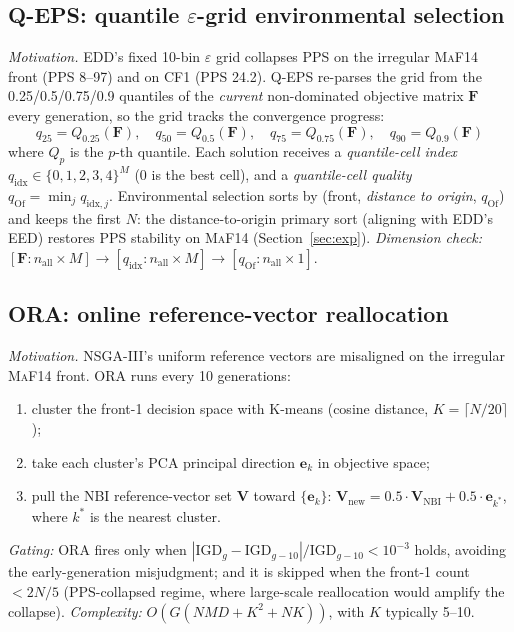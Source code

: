 \documentclass[preprint,12pt]{elsarticle}
\begin{document}
\subsection{\textsc{Q-EPS}: quantile $\varepsilon$-grid environmental
selection}
\label{sec:qeps}
\emph{Motivation.} EDD's fixed 10-bin $\varepsilon$ grid collapses PPS on
the irregular \textsc{MaF14} front (PPS 8--97) and on \textsc{CF1}
(PPS 24.2). \textsc{Q-EPS} re-parses the grid from the 0.25/0.5/0.75/0.9
quantiles of the \emph{current} non-dominated objective matrix
$\mathbf{F}$ every generation, so the grid tracks the convergence progress:
\begin{equation}
q_{25}=Q_{0.25}(\mathbf{F}),\quad
q_{50}=Q_{0.5}(\mathbf{F}),\quad
q_{75}=Q_{0.75}(\mathbf{F}),\quad
q_{90}=Q_{0.9}(\mathbf{F})
\end{equation}
where $Q_p$ is the $p$-th quantile. Each solution receives a
\emph{quantile-cell index} $q_{\mathrm{idx}}\in\{0,1,2,3,4\}^{M}$ (0 is the
best cell), and a \emph{quantile-cell quality}
$q_{\mathrm{Of}}=\min_j q_{\mathrm{idx},j}$. Environmental selection
sorts by (front, \emph{distance to origin}, $q_{\mathrm{Of}}$) and keeps the
first $N$: the distance-to-origin primary sort (aligning with EDD's
\textsc{EED}) restores PPS stability on \textsc{MaF14} (Section~\ref{sec:exp}).
\emph{Dimension check:} $[\mathbf{F}:n_{\text{all}}\times M]\to[q_{\mathrm{idx}}:
n_{\text{all}}\times M]\to[q_{\mathrm{Of}}:n_{\text{all}}\times 1]$.

\subsection{\textsc{ORA}: online reference-vector reallocation}
\label{sec:ora}
\emph{Motivation.} NSGA-III's uniform reference vectors are misaligned on
the irregular \textsc{MaF14} front. \textsc{ORA} runs every 10 generations:
\begin{enumerate}
\item cluster the front-1 decision space with K-means (cosine distance,
  $K=\lceil N/20\rceil$);
\item take each cluster's PCA principal direction $\mathbf{e}_k$ in
  objective space;
\item pull the NBI reference-vector set $\mathbf{V}$ toward
  $\{\mathbf{e}_k\}$: $\mathbf{V}_{\text{new}}=0.5\cdot\mathbf{V}_{\mathrm{NBI}}
  +0.5\cdot\mathbf{e}_{k^*}$, where $k^*$ is the nearest cluster.
\end{enumerate}
\emph{Gating:} \textsc{ORA} fires only when
$\left|\mathrm{IGD}_g-\mathrm{IGD}_{g-10}\right|/\mathrm{IGD}_{g-10}<10^{-3}$
holds, avoiding the early-generation misjudgment; and it is skipped when the
front-1 count $<2N/5$ (PPS-collapsed regime, where large-scale reallocation
would amplify the collapse).
\emph{Complexity:} $O(G(N M D+K^2+NK))$, with $K$ typically 5--10.
\end{document}
